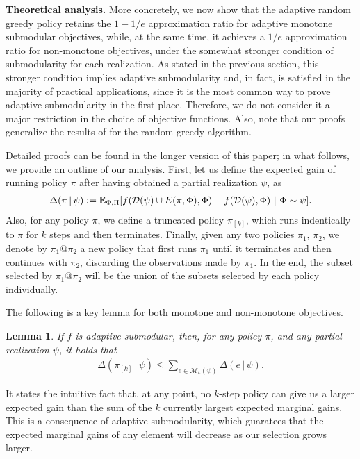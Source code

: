 \documentclass{article}
\newtheorem{lemma}{Lemma}
\newcommand{\defeq}{\vcentcolon=}
\newcommand{\mmid}{\,\vert\,}
\newcommand{\D}[2]{\Delta(#1\mmid#2)}
\newcommand{\pik}{\pi_{[k]}}
\newcommand{\dom}{\mathcal{D}}
\newcommand{\Mk}{\mathcal{M}_k}
\renewcommand{\paragraph}[1]{\vspace{0.3em}\noindent\textbf{#1.}\makebox[0.5em]{}}
\begin{document}
\paragraph{Theoretical analysis}
More concretely, we now show that the adaptive random greedy policy retains the $1-1/e$ approximation ratio for adaptive monotone submodular objectives, while, at the same time, it achieves a $1/e$ approximation ratio for non-monotone objectives, under the somewhat stronger condition of submodularity for each realization.
As stated in the previous section, this stronger condition implies adaptive submodularity and, in fact, is satisfied in the majority of practical applications, since it is the most common way to prove adaptive submodularity in the first place.
Therefore, we do not consider it a major restriction in the choice of objective functions.
Also, note that our proofs generalize the results of \cite{buchbinder14} for the random greedy algorithm.

Detailed proofs can be found in the longer version of this paper; in what follows, we provide an outline of our analysis.
First, let us define the expected gain of running policy $\pi$ after having obtained a partial realization $\psi$, as
{\small
\begin{align*}
  \D{\pi}{\psi} \defeq \E[\Phi,\Pi]{f(\dom(\psi) \cup E(\pi, \Phi), \Phi) - f(\dom(\psi), \Phi)}[\Phi \sim \psi].
\end{align*}}
Also, for any policy $\pi$, we define a truncated policy $\pik$, which runs indentically to $\pi$ for $k$ steps and then terminates.
Finally, given any two policies $\pi_1$, $\pi_2$, we denote by $\pi_1@\pi_2$ a new policy that first runs $\pi_1$ until it terminates and then continues with $\pi_2$, discarding the observations made by $\pi_1$.
In the end, the subset selected by $\pi_1@\pi_2$ will be the union of the subsets selected by each policy individually.

The following is a key lemma for both monotone and non-monotone objectives.
\setcounter{lemma}{0}
\begin{lemma}
  If $f$ is adaptive submodular, then, for any policy $\pi$, and any partial realization $\psi$, it holds that
  \begin{align*}
    \D{\pik}{\psi} \leq \sum_{e \in \Mk(\psi)} \D{e}{\psi}.
  \end{align*}
\end{lemma}
\noindent It states the intuitive fact that, at any point, no $k$-step policy can give us a larger expected gain than the sum of the $k$ currently largest expected marginal gains.
This is a consequence of adaptive submodularity, which guaratees that the expected marginal gains of any element will decrease as our selection grows larger.
\end{document}
